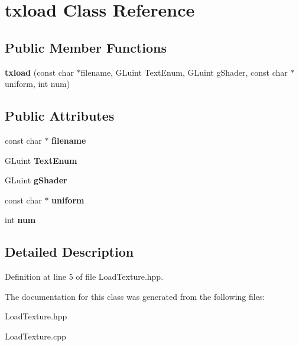\hypertarget{classtxload}{\section{txload Class Reference}
\label{classtxload}
}
\subsection*{Public Member Functions}
\begin{DoxyCompactItemize}
\item 
\hypertarget{classtxload_ab9da9ed1b71d2ddaab7df3ed889525eb}{{\bfseries txload} (const char $\ast$filename, G\-Luint Text\-Enum, G\-Luint g\-Shader, const char $\ast$uniform, int num)}\label{classtxload_ab9da9ed1b71d2ddaab7df3ed889525eb}

\end{DoxyCompactItemize}
\subsection*{Public Attributes}
\begin{DoxyCompactItemize}
\item 
\hypertarget{classtxload_a3bf11d886fa0b9d9cdb96f1dbb50a7fa}{const char $\ast$ {\bfseries filename}}\label{classtxload_a3bf11d886fa0b9d9cdb96f1dbb50a7fa}

\item 
\hypertarget{classtxload_a434622c4f197b65c8121c3babc332d7d}{G\-Luint {\bfseries Text\-Enum}}\label{classtxload_a434622c4f197b65c8121c3babc332d7d}

\item 
\hypertarget{classtxload_a6d71f2bdca8e995e88a7c0e9cc9dfa47}{G\-Luint {\bfseries g\-Shader}}\label{classtxload_a6d71f2bdca8e995e88a7c0e9cc9dfa47}

\item 
\hypertarget{classtxload_a23aee3e0e6f6847c75b777f6e8825c3e}{const char $\ast$ {\bfseries uniform}}\label{classtxload_a23aee3e0e6f6847c75b777f6e8825c3e}

\item 
\hypertarget{classtxload_a7173d10b57d5d095b0deb0857d163055}{int {\bfseries num}}\label{classtxload_a7173d10b57d5d095b0deb0857d163055}

\end{DoxyCompactItemize}


\subsection{Detailed Description}


Definition at line 5 of file Load\-Texture.\-hpp.



The documentation for this class was generated from the following files\-:\begin{DoxyCompactItemize}
\item 
Load\-Texture.\-hpp\item 
Load\-Texture.\-cpp\end{DoxyCompactItemize}
